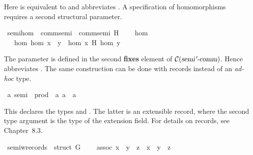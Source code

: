 \begin{isabellebody}
\begin{isamarkuptext}
Here  is equivalent to  and
  abbreviates .  A specification of homomorphisms
  requires a second structural parameter.%
\end{isamarkuptext}%
\isamarkuptrue%
\isamarkupfalse%
\ semi{\isacharprime}{\isacharunderscore}hom\ {\isacharequal}\ comm{\isacharunderscore}semi{\isacharprime}\ {\isacharplus}\ comm{\isacharunderscore}semi{\isacharprime}\ H\ {\isacharplus}\isanewline
\ \ \ hom\isanewline
\ \ \ hom{\isacharcolon}\ {\isachardoublequoteopen}hom\ {\isacharparenleft}x\ {\isasymstar}\ y{\isacharparenright}\ {\isacharequal}\ hom\ x\ {\isasymstar}\isactrlbsub H\isactrlesub \ hom\ y{\isachardoublequoteclose}%
\begin{isamarkuptext}%
The parameter  is defined in the second \textbf{fixes}
  element of $\mathcal{C}(\emph{\sl semi{\emph{$\mskip2mu{'}\mskip-2mu$}}{\mbox{-}}comm})$. Hence 
  abbreviates .  The same construction can be done
  with records instead of an \textit{ad-hoc} type.%
\end{isamarkuptext}%
\isamarkuptrue%
\isamarkupfalse%
\ {\isacharprime}a\ semi\ {\isacharequal}\ prod\ {\isacharcolon}{\isacharcolon}\ {\isachardoublequoteopen}{\isacharbrackleft}{\isacharprime}a{\isacharcomma}\ {\isacharprime}a{\isacharbrackright}\ {\isasymRightarrow}\ {\isacharprime}a{\isachardoublequoteclose}\ {\isacharparenleft}\ {\isachardoublequoteopen}{\isasymbullet}{\isasymindex}{\isachardoublequoteclose}\ {}{}{\isacharparenright}%
\begin{isamarkuptext}%
This declares the types  and  .  The latter is an extensible record, where the second
  type argument is the type of the extension field.  For details on
  records, see \cite{NipkowEtAl2002} Chapter~8.3.%
\end{isamarkuptext}%
\isamarkuptrue%
\isamarkupfalse%
\ semi{\isacharunderscore}w{\isacharunderscore}records\ {\isacharequal}\ struct\ G\ {\isacharplus}\isanewline
\ \ \ assoc{\isacharcolon}\ {\isachardoublequoteopen}{\isacharparenleft}x\ {\isasymbullet}\ y{\isacharparenright}\ {\isasymbullet}\ z\ {\isacharequal}\ x\ {\isasymbullet}\ {\isacharparenleft}y\ {\isasymbullet}\ z{\isacharparenright}{\isachardoublequoteclose}%

\end{isabellebody}
